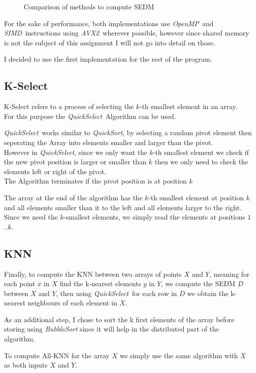 \documentclass[10pt, a4paper]{article}
\newcommand{\omp}{\textit{OpenMP}}
\newcommand{\simd}{\textit{SIMD}}
\newcommand{\avx}{\textit{AVX2}}
\newcommand{\qselect}{\textit{QuickSelect}}
\newcommand{\qsort}{\textit{QuickSort}}
\begin{document}
\begin{figure}[h]
\begin{subfigure}{.33\textwidth}
	\end{subfigure}
	\caption{Comparison of methods to compute SEDM}
	\label{sedm}
\end{figure}

For the sake of performance, both implementations use \omp \ and \simd \ instructions using \avx \ 
wherever possible, however since shared memory is not the subject of this assignment I will not go into
detail on those.

I decided to use the first implementation for the rest of the program.

\subsection{K-Select}
K-Select refers to a process of selecting the $k$-th smallest element in an array. \\
For this purpose the \qselect \ Algorithm can be used. 

\qselect \ works similar to \qsort, by selecting a random pivot element then seperating the Array into
elements smaller and larger than the pivot. \\
However in \qselect, since we only want the $k$-th smallest
element we check if the new pivot position is larger or smaller than $k$ then we only need to check the 
elements left or right of the pivot. \\
The Algorithm terminates if the pivot position is at position $k$

The array at the end of the algorithm has the $k$-th smallest element at position $k$ and all elements
smaller than it to the left and all elements larger to the right. Since we need the $k$-smallest elements,
we simply read the elements at positions $1$..$k$.

\subsection{KNN}
Finally, to compute the KNN between two arrays of points $X$ and $Y$, meaning for each point $x$ in $X$
find the k-nearest elements $y$ in $Y$, we compute the SEDM $D$ between $X$ and $Y$, then using
\qselect \ for each row in $D$ we obtain the k-nearest neighbours of each element in $X$.

As an additional step, I chose to sort the k first elements of the array before storing using 
\textit{BubbleSort} since it will help in the distributed part of the algorithm.

To compute All-KNN for the array $X$ we simply use the same algorithm with $X$ as both inputs $X$ and $Y$.
\end{document}
